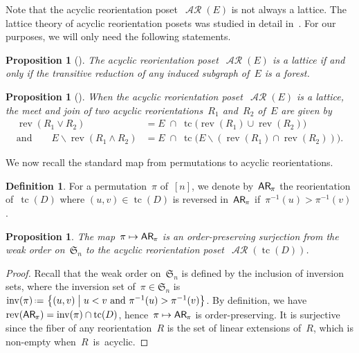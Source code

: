 \documentclass{amsart}
\newtheorem{proposition}[theorem]{Proposition}
\theoremstyle{definition}
\newtheorem{definition}[theorem]{Definition}
\renewcommand{\c}[1]{\mathcal{#1}} %
\newcommand{\set}[2]{\left\{ #1 \;\middle|\; #2 \right\}} %
\newcommand{\ssm}{\smallsetminus} %
\newcommand{\eqdef}{\mbox{\,\raisebox{0.2ex}{\scriptsize\ensuremath{\mathrm:}}\ensuremath{=}\,}} %
\DeclareMathOperator{\inv}{inv} %
\DeclareMathOperator{\tc}{tc} %
\newcommand{\fS}{\mathfrak{S}} %
\newcommand{\meet}{\wedge} %
\newcommand{\join}{\vee} %
\newcommand{\mymap}[2]{\mathsf{#1}_{\hspace{-.7pt}#2}}
\DeclareMathOperator{\AReori}{\c{AR}}  %
\newcommand{\areori}[1]{\mymap{AR}{#1}}  %
\DeclareMathOperator{\rev}{rev} %
\begin{document}
Note that the acyclic reorientation poset~$\AReori(E)$ is not always a lattice.
The lattice theory of acyclic reorientation posets was studied in detail in~\cite{Pilaud-acyclicReorientationLattices}.
For our purposes, we will only need the following statements.

\begin{proposition}[{\cite[Thm.~1]{Pilaud-acyclicReorientationLattices}}]
\label{prop:AReoriLat}
The acyclic reorientation poset~$\AReori(E)$ is a lattice if and only if the transitive reduction of any induced subgraph of~$E$ is a forest.
\end{proposition}

\begin{proposition}[{\cite[Thm.~9]{Pilaud-acyclicReorientationLattices}}]
\label{prop:AReoriLatJoinMeet}
When the acyclic reorientation poset~$\AReori(E)$ is a lattice, the meet and join of two acyclic reorientations~$R_1$ and~$R_2$ of~$E$ are given by
\begin{align*}
\rev(R_1 \join R_2) & = E \;\cap\; \tc \!\big( \rev(R_1) \cup \rev(R_2) \big) \\
\text{and}\qquad
E \ssm \rev(R_1 \meet R_2) & = E \;\cap\; \tc \!\big( E \ssm (\rev(R_1) \cap \rev(R_2)) \big).
\end{align*}
\end{proposition}

We now recall the standard map from permutations to acyclic reorientations.

\begin{definition}
\label{def:Perm2AReori}
For a permutation~$\pi$ of~$[n]$, we denote by~$\areori{\pi}$ the reorientation of~$\tc(D)$ where $(u,v) \in \tc(D)$ is reversed in~$\areori{\pi}$ if~$\pi^{-1}(u) > \pi^{-1}(v)$.
\end{definition}

\begin{proposition}
\label{prop:Perm2AReori}
The map~$\pi \mapsto \areori{\pi}$ is an order-preserving surjection from the weak order on~$\fS_n$ to the acyclic reorientation poset~$\AReori(\tc(D))$.
\end{proposition}

\begin{proof}
Recall that the weak order on~$\fS_n$ is defined by the inclusion of inversion sets, where the inversion set of~$\pi \in \fS_n$ is~$\inv(\pi) \eqdef \set{(u,v)}{u < v \text{ and } \pi^{-1}(u) > \pi^{-1}(v)}$.
By definition, we have~$\rev(\areori{\pi}) = \inv(\pi) \cap \tc(D)$, hence~$\pi \mapsto \areori{\pi}$ is order-preserving.
It is surjective since the fiber of any reorientation~$R$ is the set of linear extensions of~$R$, which is non-empty when~$R$~is~acyclic.
\end{proof}
\end{document}
